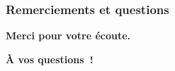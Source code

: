 \documentclass[10pt, mathserif]{beamer}
\theoremstyle{definition}
\theoremstyle{remark}
\begin{document}
	\begin{frame}
		\frametitle{Remerciements et questions}

		\begin{center} \textbf{Merci pour votre écoute.}
		
		\vspace{2cm}

		\textbf{À vos questions~!}\end{center}
	\end{frame}
\end{document}
